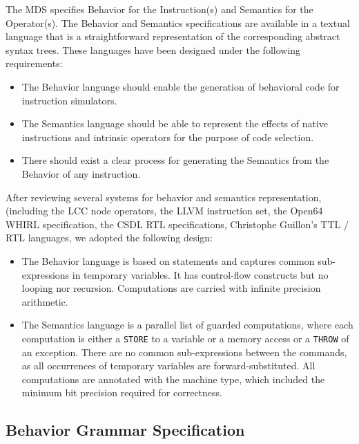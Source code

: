 \documentclass[11pt,a4paper]{article}
\begin{document}
The MDS specifies Behavior for the Instruction(s) and Semantics for the
Operator(s). The Behavior and Semantics specifications are available in a
textual language that is a straightforward representation of the corresponding
abstract syntax trees. These languages have been designed under the following
requirements: \begin{itemize}

\item The Behavior language should enable the generation of behavioral code for
instruction simulators.

\item The Semantics language should be able to represent the effects of native
instructions and intrinsic operators for the purpose of code selection.

\item There should exist a clear process for generating the Semantics from the
Behavior of any instruction.

\end{itemize}

After reviewing several systems for behavior and semantics representation,
(including the LCC node operators, the LLVM instruction set, the Open64 WHIRL
specification, the CSDL RTL specifications, Christophe Guillon's TTL / RTL
languages, we adopted the following design: \begin{itemize}

\item The Behavior language is based on statements and captures common
sub-expressions in temporary variables. It has control-flow constructs but no
looping nor recursion. Computations are carried with infinite precision
arithmetic.

\item The Semantics language is a parallel list of guarded computations, where
each computation is either a \texttt{STORE} to a variable or a memory access or
a \texttt{THROW} of an exception. There are no common sub-expressions between
the commands, as all occurrences of temporary variables are forward-substituted.
All computations are annotated with the machine type, which included the minimum
bit precision required for correctness.

\end{itemize}


\subsection{Behavior Grammar Specification}
\end{document}
